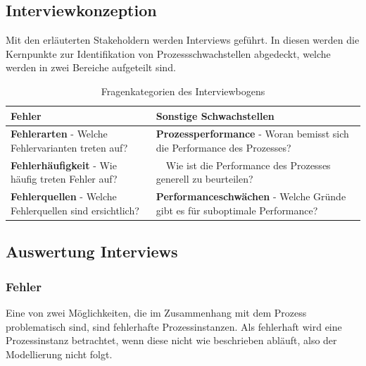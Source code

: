 \subsection{Interviewkonzeption}
Mit den erläuterten Stakeholdern werden Interviews geführt.
In diesen werden die Kernpunkte zur Identifikation von Prozessschwachstellen abgedeckt, welche werden in zwei Bereiche aufgeteilt sind.


\begin{table}[!htb]
\centering
\caption{Fragenkategorien des Interviewbogens}
\label{Fragenkategorien des Interviewbogens}
\begin{tabular}{|p{8cm}|p{8cm}|}
\hline
\rowcolor[HTML]{FFFFC7} 
{\color[HTML]{000000} \textbf{Fehler}} & {\color[HTML]{000000} \textbf{Sonstige Schwachstellen}} \\ \hline
\textbf{Fehlerarten} - \newline Welche Fehlervarianten treten auf?   &  \textbf{Prozessperformance} - \newline Woran bemisst sich die Performance des Prozesses? \newline                           \\ 
\textbf{Fehlerhäufigkeit} - \newline Wie häufig treten Fehler auf?  &   ~\ \newline Wie ist die Performance des Prozesses generell zu beurteilen?   \newline     ~\                                                                      \\ 
\textbf{Fehlerquellen} - \newline Welche Fehlerquellen sind ersichtlich? & \textbf{Performanceschwächen} - \newline Welche Gründe gibt es für suboptimale Performance?  \\                            

\hline
\end{tabular}
\end{table}


\subsection{Auswertung Interviews}






\subsubsection{Fehler}
Eine von zwei Möglichkeiten, die im Zusammenhang mit dem Prozess problematisch sind, sind fehlerhafte Prozessinstanzen. Als fehlerhaft wird eine Prozessinstanz betrachtet, wenn diese nicht wie beschrieben abläuft, also der Modellierung nicht folgt.

